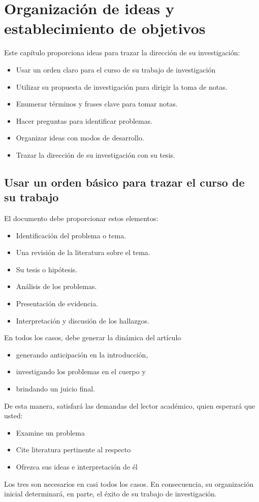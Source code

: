 \chapter{Organización de ideas y establecimiento de objetivos}
Este capítulo proporciona ideas para trazar la dirección de su investigación:
\begin{itemize}
    \item Usar un orden claro para el curso de su trabajo de investigación 
    \item Utilizar su propuesta de investigación para dirigir la toma de notas.
    \item Enumerar términos y frases clave para tomar notas.
    \item Hacer preguntas para identificar problemas. 
    \item Organizar ideas con modos de desarrollo.
    \item Trazar la dirección de su investigación con su tesis.
\end{itemize}

\section{Usar un orden básico para trazar el curso de su trabajo}
El documento debe proporcionar estos elementos:
\begin{itemize}
    \item Identificación del problema o tema.
    \item Una revisión de la literatura sobre el tema.
    \item Su tesis o hipótesis.
    \item Análisis de los problemas.
    \item Presentación de evidencia.
    \item Interpretación y discusión de los hallazgos.
\end{itemize}

En todos los casos, debe generar la dinámica del artículo
\begin{itemize}
    \item generando anticipación en la introducción, 
    \item investigando los problemas en el cuerpo y 
    \item brindando un juicio final. 
\end{itemize}
De esta manera, satisfará las demandas del lector académico, quien esperará que usted: 

\begin{itemize}
    \item Examine un problema 
    \item Cite literatura pertinente al respecto 
    \item Ofrezca sus ideas e interpretación de él
\end{itemize}
Los tres son necesarios en casi todos los casos. En consecuencia, su organización inicial determinará, en parte, el éxito de su trabajo de investigación.

